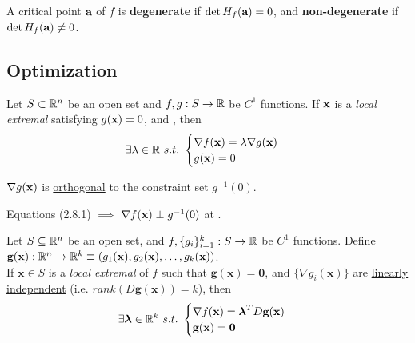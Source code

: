 \documentclass[11pt]{article}
\begin{document}
			\begin{definition}
				A critical point $\textbf{a}$ of $f$ is \textbf{degenerate} if $\det H_f(\textbf{a}) = 0$, and \textbf{non-degenerate} if $\det H_f(\textbf{a}) \neq 0$.
			\end{definition}
		
		\subsection{Optimization}
			\begin{theorem}
				Let $S \subset \mathbb{R}^n$ be an open set and $f, g: S \to \mathbb{R}$ be $C^1$ functions. If $\textbf{x}$ is a \emph{local extremal} satisfying $g(\textbf{x}) = 0$, and , then
				\begin{equation}
					\exists \lambda \in \mathbb{R}\ s.t.\ \begin{cases}
						\nabla f(\textbf{x}) = \lambda \nabla g(\textbf{x}) \\
						g(\textbf{x}) = 0
					\end{cases}
				\end{equation}
			\end{theorem}
			
			\begin{lemma}
				$\nabla g(\textbf{x})$ is \ul{orthogonal} to the constraint set $g^{-1}(0)$.
			\end{lemma}
			
			\begin{proposition}
				Equations (2.8.1) $\implies$ $\nabla f(\textbf{x}) \perp g^{-1}(0)$ at \tbf{x}.
			\end{proposition}
			
			\begin{theorem}
				Let $S \subseteq \mathbb{R}^n$ be an open set, and $f, \{g_i\}_{i=1}^k : S \to \mathbb{R}$ be $C^1$ functions. Define $\textbf{g}(\textbf{x}): \mathbb{R}^n \to \mathbb{R}^k \equiv (g_1(\textbf{x}), g_2(\textbf{x}), \dots, g_k(\textbf{x}))$. \\
				If $\textbf{x} \in S$ is a \emph{local extremal} of $f$ such that $\textbf{g}(\textbf{x}) = \textbf{0}$, and $\{\nabla g_i(\textbf{x})\}$ are \ul{linearly independent} (i.e. $rank(D\textbf{g}(\textbf{x})) = k$), then
				\begin{equation}
					\exists \boldsymbol{\lambda} \in \R^k\ s.t.\ \begin{cases}
						\nabla f(\textbf{x}) = \boldsymbol{\lambda}^T D\textbf{g}(\textbf{x}) \\
						\textbf{g}(\textbf{x}) =\textbf{0}
					\end{cases}
				\end{equation}
			\end{theorem}
			
\end{document}
